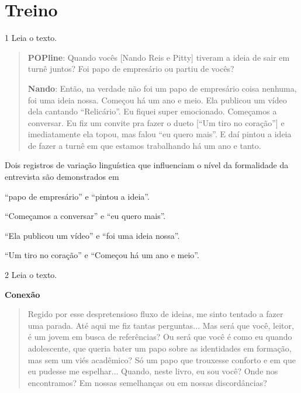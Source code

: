 \section{Treino}

\num{1} Leia o texto.

\begin{quote}\textbf{POPline}: Quando vocês {[}Nando Reis e Pitty{]} tiveram a ideia
de sair em turnê juntos? Foi papo de empresário ou partiu de vocês?

\textbf{Nando}: Então, na verdade não foi um papo de empresário coisa
nenhuma, foi uma ideia nossa. Começou há um ano e meio. Ela publicou um
vídeo dela cantando ``Relicário''. Eu fiquei super emocionado. Começamos
a conversar. Eu fiz um convite pra fazer o dueto {[}``Um tiro no
coração''{]} e imediatamente ela topou, mas falou ``eu quero mais''. E
daí pintou a ideia de fazer a turnê em que estamos trabalhando há um ano
e tanto.
\end{quote}

Dois registros de variação linguística que influenciam o nível da
formalidade da entrevista são demonstrados em

\begin{escolha}
\item ``papo de empresário'' e ``pintou a ideia''.

\item ``Começamos a conversar'' e ``eu quero mais''.

\item ``Ela publicou um vídeo'' e ``foi uma ideia nossa''.

\item ``Um tiro no coração'' e ``Começou há um ano e meio''.
\end{escolha}

\num{2} Leia o texto.

\centering\textbf{Conexão}


\begin{quote}
Regido por esse despretensioso fluxo de ideias, me sinto tentado a fazer
uma parada. Até aqui me fiz tantas perguntas... Mas será que você,
leitor, é um jovem em busca de referências? Ou será que você é como eu
quando adolescente, que queria bater um papo sobre as identidades em
formação, mas sem um viés acadêmico? Só um papo que trouxesse conforto e
em que eu pudesse me espelhar... Quando, neste livro, eu sou você? Onde
nos encontramos? Em nossas semelhanças ou em nossas discordâncias?
\end{quote}

